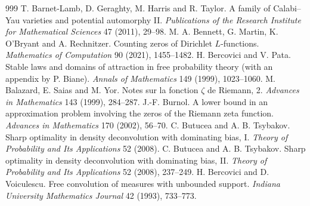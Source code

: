 \begin{thebibliography}{999}
 T. Barnet-Lamb, D. Geraghty, M. Harris and R. Taylor. A family of Calabi--Yau varieties and potential automorphy II. \emph{Publications of the Research Institute for Mathematical Sciences} 47 (2011), 29--98.
 M. A. Bennett, G. Martin, K. O'Bryant and A. Rechnitzer. Counting zeros of Dirichlet $L$-functions. \emph{Mathematics of Computation} 90 (2021), 1455--1482.
 H. Bercovici and V. Pata. Stable laws and domains of attraction in free probability theory (with an appendix by P. Biane). \emph{Annals of Mathematics} 149 (1999), 1023--1060.
 M. Balazard, E. Saias and M. Yor. Notes sur la fonction $\zeta$ de Riemann, 2. \emph{Advances in Mathematics} 143 (1999), 284--287.
 J.-F. Burnol. A lower bound in an approximation problem involving the zeros of the Riemann zeta function. \emph{Advances in Mathematics} 170 (2002), 56--70.
 C. Butucea and A. B. Tsybakov. Sharp optimality in density deconvolution with dominating bias, I. \emph{Theory of Probability and Its Applications} 52 (2008).
 C. Butucea and A. B. Tsybakov. Sharp optimality in density deconvolution with dominating bias, II. \emph{Theory of Probability and Its Applications} 52 (2008), 237--249.
 H. Bercovici and D. Voiculescu. Free convolution of measures with unbounded support. \emph{Indiana University Mathematics Journal} 42 (1993), 733--773.

\end{thebibliography}
